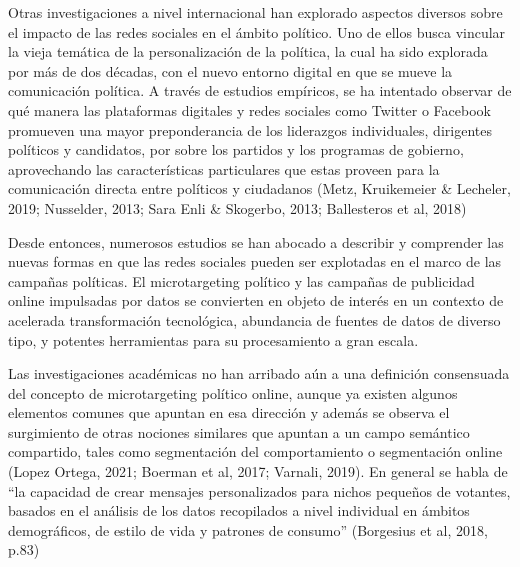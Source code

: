 \documentclass[
  10pt,
  letterpaper,
]{report}
\begin{document}
Otras investigaciones a nivel internacional han explorado aspectos
diversos sobre el impacto de las redes sociales en el ámbito político.
Uno de ellos busca vincular la vieja temática de la personalización de
la política, la cual ha sido explorada por más de dos décadas, con el
nuevo entorno digital en que se mueve la comunicación política. A través
de estudios empíricos, se ha intentado observar de qué manera las
plataformas digitales y redes sociales como Twitter o Facebook promueven
una mayor preponderancia de los liderazgos individuales, dirigentes
políticos y candidatos, por sobre los partidos y los programas de
gobierno, aprovechando las características particulares que estas
proveen para la comunicación directa entre políticos y ciudadanos (Metz,
Kruikemeier \& Lecheler, 2019; Nusselder, 2013; Sara Enli \& Skogerbo,
2013; Ballesteros et al, 2018)

Desde entonces, numerosos estudios se han abocado a describir y
comprender las nuevas formas en que las redes sociales pueden ser
explotadas en el marco de las campañas políticas. El microtargeting
político y las campañas de publicidad online impulsadas por datos se
convierten en objeto de interés en un contexto de acelerada
transformación tecnológica, abundancia de fuentes de datos de diverso
tipo, y potentes herramientas para su procesamiento a gran escala.

Las investigaciones académicas no han arribado aún a una definición
consensuada del concepto de microtargeting político online, aunque ya
existen algunos elementos comunes que apuntan en esa dirección y además
se observa el surgimiento de otras nociones similares que apuntan a un
campo semántico compartido, tales como segmentación del comportamiento o
segmentación online (Lopez Ortega, 2021; Boerman et al, 2017; Varnali,
2019). En general se habla de ``la capacidad de crear mensajes
personalizados para nichos pequeños de votantes, basados en el análisis
de los datos recopilados a nivel individual en ámbitos demográficos, de
estilo de vida y patrones de consumo'' (Borgesius et al, 2018, p.83)
\end{document}
